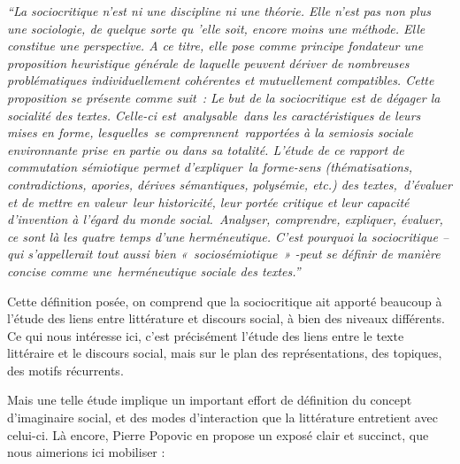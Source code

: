 \documentclass[letterpaper,portrait,12pt]{article}
\begin{document}
\emph{\textcolor[rgb]{0.000,0.000,0.000}{	{``}}}\emph{\textcolor[rgb]{0.000,0.000,0.000}{La sociocritique n'est ni une discipline ni une th\'{e}orie. Elle n'est pas non plus une sociologie, de quelque sorte qu 'elle soit, encore moins une m\'{e}thode. Elle constitue une perspective. A ce titre, elle pose comme principe fondateur une proposition heuristique g\'{e}n\'{e}rale de laquelle peuvent d\'{e}river de nombreuses probl\'{e}matiques individuellement coh\'{e}rentes et mutuellement compatibles. Cette proposition se pr\'{e}sente comme suit : Le but de la sociocritique est de d\'{e}gager la socialit\'{e} des textes. Celle-ci est }}\emph{\textcolor[rgb]{0.000,0.000,0.000}{analysable}}\emph{\textcolor[rgb]{0.000,0.000,0.000}{ dans les caract\'{e}ristiques de leurs mises en forme, lesquelles }}\emph{\textcolor[rgb]{0.000,0.000,0.000}{se comprennent}}\emph{\textcolor[rgb]{0.000,0.000,0.000}{ rapport\'{e}es \`{a} la semiosis sociale environnante prise en partie ou dans sa totalit\'{e}. L'\'{e}tude de ce rapport de commutation s\'{e}miotique permet d'}}\emph{\textcolor[rgb]{0.000,0.000,0.000}{expliquer}}\emph{\textcolor[rgb]{0.000,0.000,0.000}{ la forme-sens (th\'{e}matisations, contradictions, apories, d\'{e}rives s\'{e}mantiques, polys\'{e}mie, etc.) des textes, }}\emph{\textcolor[rgb]{0.000,0.000,0.000}{d'\'{e}valuer et de mettre en valeur}}\emph{\textcolor[rgb]{0.000,0.000,0.000}{ leur historicit\'{e}, leur port\'{e}e critique et leur capacit\'{e} d'invention \`{a} l'\'{e}gard du monde social. }}\emph{\textcolor[rgb]{0.000,0.000,0.000}{Analyser, comprendre, expliquer, \'{e}valuer}}\emph{\textcolor[rgb]{0.000,0.000,0.000}{, ce sont l\`{a} les quatre temps d'une herm\'{e}neutique. C'est pourquoi la sociocritique -- qui s'appellerait tout aussi bien « socios\'{e}miotique » -peut se d\'{e}finir de mani\`{e}re concise comme une }}\emph{\textcolor[rgb]{0.000,0.000,0.000}{herm\'{e}neutique sociale des textes.''}}





\textcolor[rgb]{0.000,0.000,0.000}{	Cette d\'{e}finition pos\'{e}e, on comprend que la sociocritique ait apport\'{e} beaucoup \`{a} l'\'{e}tude des liens entre litt\'{e}rature et discours social, \`{a} bien des niveaux diff\'{e}rents. Ce qui nous int\'{e}resse ici, c'est pr\'{e}cis\'{e}ment l'\'{e}tude des liens entre le texte litt\'{e}raire et le discours social, mais sur le plan des repr\'{e}sentations, des topiques, des motifs r\'{e}currents.}


\textcolor[rgb]{0.000,0.000,0.000}{Mais une telle \'{e}tude implique un important effort de d\'{e}finition du concept d'imaginaire social, et des modes d'interaction que la litt\'{e}rature entretient avec celui-ci. L\`{a} encore, Pierre Popovic en propose un expos\'{e} clair et succinct, que nous aimerions ici mobiliser :}
\end{document}

